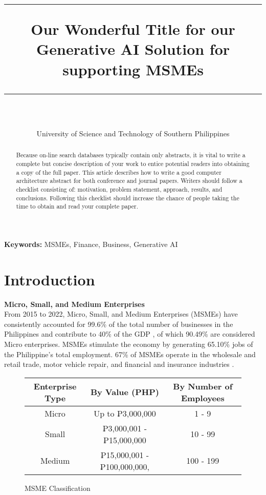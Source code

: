\documentclass{article}
\title{\vspace{0cm} %
    \hrule height 1.5mm %
    \vspace{1cm}
    \textbf{\LARGE Our Wonderful Title for our Generative AI Solution for supporting MSMEs}
    \vspace{1cm}
    \hrule height 0.5mm %
}
\author{
    \text{Chris Andrei Irag} \hspace{0.5cm} 
    \text{Frency Rayne Montesclaros} \hspace{0.5cm}  \vspace{0.3cm}
    \text{Genheylou Felisilda} \\  \vspace{0.5cm}
    \text{Kein Jake Culanggo} \hspace{2cm}
    \text{Keith Laspoña} \\ 
    \vspace{0.2cm}
    University of Science and Technology of Southern Philippines
}
\date{}
\begin{document}
\maketitle

\begin{abstract} 
    \noindent
   Because on-line search databases typically contain only abstracts, it is vital to write a complete but concise description of your work to entice potential readers into obtaining a copy of the full paper. This article describes how to write a good computer architecture abstract for both conference and journal papers. Writers should follow a checklist consisting of: motivation, problem statement, approach, results, and conclusions. Following this checklist should increase the chance of people taking the time to obtain and read your complete paper.

\end{abstract}
\vspace{0.5cm}
\textbf{Keywords:} MSMEs, Finance, Business, Generative AI




\section{Introduction}

\textbf{Micro, Small, and Medium Enterprises} \\
From 2015 to 2022, Micro, Small, and Medium Enterprises (MSMEs) have consistently accounted for 99.6\% of the total number of businesses in the Philippines \parencite{department_of_trade_and_industry_philippines_msme_2022, ibarra_accounting_2015} and contribute to 40\% of the GDP \parencite{united_nations_development_program_msme_2020}, of which 90.49\% are considered Micro enterprises. MSMEs stimulate the economy by generating 65.10\% jobs of the Philippine's total employment. 67\% of MSMEs operate in the wholesale and retail trade, motor vehicle repair, and financial and insurance industries \parencite{philippine_statistics_authority_2018_2018}.

\begin{figure}[h!]
\centering
\def\arraystretch{1.5}
\begin{tabular}{|c||c|c|}
\hline
Enterprise Type & By Value (PHP) & By Number of Employees \\ \hline
Micro & Up to ₱3,000,000 & 1 - 9 \\ \hline
Small & ₱3,000,001 - ₱15,000,000 & 10 - 99 \\ \hline
Medium & ₱15,000,001 - ₱100,000,000, & 100 - 199 \\
\hline
\end{tabular}
\caption{MSME Classification}
\label{fig:MSME Classification}
\end{figure}
\end{document}
